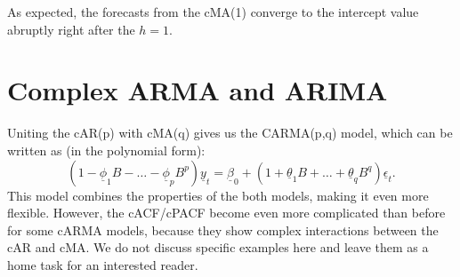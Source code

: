 \documentclass[
]{book}
\begin{document}
As expected, the forecasts from the cMA(1) converge to the intercept value abruptly right after the \(h=1\).

\hypertarget{DynamicARIMA}{%
\section{Complex ARMA and ARIMA}\label{DynamicARIMA}}

Uniting the cAR(p) with cMA(q) gives us the CARMA(p,q) model, which can be written as (in the polynomial form):
\begin{equation}
    \left(1 - \underline{\phi}_1 B - \dots - \underline{\phi}_p B^p \right) \underline{y}_t  = \underline{\beta}_0 + \left(1 + \underline{\theta}_1 B + \dots + \underline{\theta}_q B^q \right) \underline{\epsilon}_t .
    \label{eq:ComplexARMAPolynomial}
\end{equation}
This model combines the properties of the both models, making it even more flexible. However, the cACF/cPACF become even more complicated than before for some cARMA models, because they show complex interactions between the cAR and cMA. We do not discuss specific examples here and leave them as a home task for an interested reader.
\end{document}
